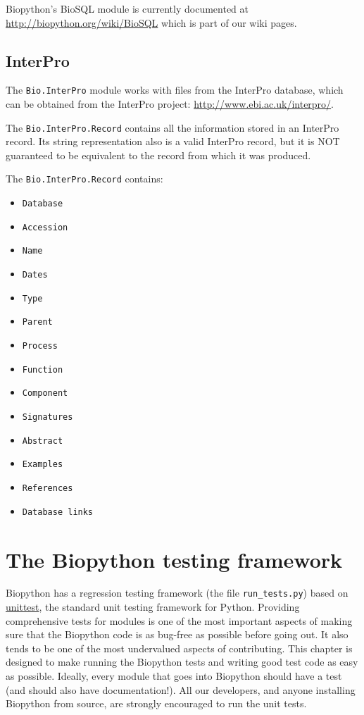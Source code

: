 \documentclass{report}
\begin{document}
Biopython's BioSQL module is currently documented at
\url{http://biopython.org/wiki/BioSQL} which is part of our wiki pages.

\section{InterPro}

The \verb|Bio.InterPro| module works with files from the
InterPro database, which can be obtained from the InterPro project:
\url{http://www.ebi.ac.uk/interpro/}.

The \verb|Bio.InterPro.Record| contains all the information stored in
an InterPro record. Its string representation also is a valid InterPro
record, but it is NOT guaranteed to be equivalent to the record
from which it was produced.

The \verb|Bio.InterPro.Record| contains:

\begin{itemize}
  \item \verb|Database|
  \item \verb|Accession|
  \item \verb|Name|
  \item \verb|Dates|
  \item \verb|Type|
  \item \verb|Parent|
  \item \verb|Process|
  \item \verb|Function|
  \item \verb|Component|
  \item \verb|Signatures|
  \item \verb|Abstract|
  \item \verb|Examples|
  \item \verb|References|
  \item \verb|Database links|
\end{itemize}

\chapter{The Biopython testing framework}
\label{sec:regr_test}

Biopython has a regression testing framework (the file
\verb|run_tests.py|) based on
\href{http://docs.python.org/library/unittest.html}{unittest},
the standard unit testing framework for Python.  Providing comprehensive
tests for modules is one of the most important aspects of making sure that
the Biopython code is as bug-free as possible before going out.
It also tends to be one of the most undervalued aspects of contributing.
This chapter is designed to make running the Biopython tests and
writing good test code as easy as possible.
Ideally, every module that goes into Biopython
should have a test (and should also have documentation!).
All our developers, and anyone installing Biopython from source,
are strongly encouraged to run the unit tests.
\end{document}
